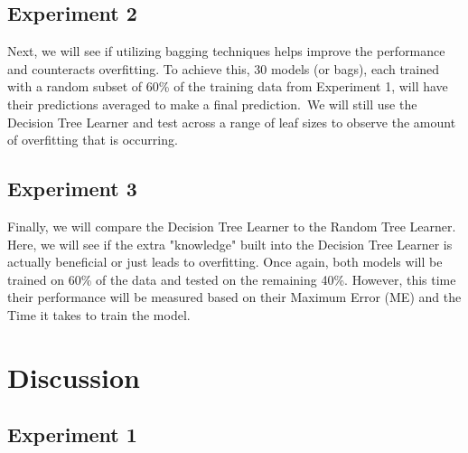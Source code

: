 \documentclass[
	letterpaper, %
]{jdf}
\begin{document}
\subsection{Experiment 2}
Next, we will see if utilizing bagging techniques helps improve the performance and counteracts overfitting.
To achieve this, 30 models (or bags), each trained with a random subset of 60\% of the training data from Experiment 1, will have their predictions averaged to make a final prediction.\
We will still use the Decision Tree Learner and test across a range of leaf sizes to observe the amount of overfitting that is occurring.

\subsection{Experiment 3}
Finally, we will compare the Decision Tree Learner to the Random Tree Learner.
Here, we will see if the extra "knowledge" built into the Decision Tree Learner is actually beneficial or just leads to overfitting.
Once again, both models will be trained on 60\% of the data and tested on the remaining 40\%.
However, this time their performance will be measured based on their Maximum Error (ME) and the Time it takes to train the model. %


\section{Discussion}

\subsection{Experiment 1}
\end{document}
